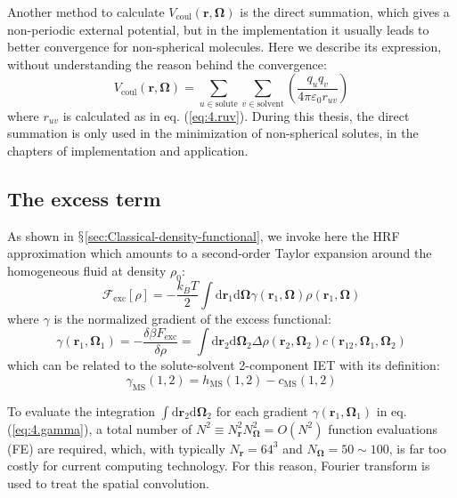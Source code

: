 Another method to calculate $V_{\mathrm{coul}}(\mathbf{r},\mathbf{\Omega})$
is the direct summation, which gives a non-periodic external potential,
but in the implementation it usually leads to better convergence for
non-spherical molecules. Here we describe its expression, without understanding the reason
behind the convergence:
\begin{equation}
V_{\mathrm{coul}}(\mathbf{r},\mathbf{\Omega})=\sum_{u\in\mathrm{solute}}\sum_{v\in\mathrm{solvent}}\left(\dfrac{q_{u}q_{v}}{4\pi\varepsilon_{0}r_{uv}}\right)
\end{equation}
where $r_{uv}$ is calculated as in eq. (\ref{eq:4.ruv}). During
this thesis, the direct summation is only used in the minimization
of non-spherical solutes, in the chapters of implementation and application.

\subsection{The excess term\label{subsec:The-excess-term}}

As shown in $\mathsection$\ref{sec:Classical-density-functional},
we invoke here the \acs{HRF} approximation which amounts to a second-order
Taylor expansion around the homogeneous fluid at density $\rho_{0}$:
\begin{equation}
\mathcal{F}_{\mathrm{exc}}[\rho]=-\frac{k_{B}T}{2}\int\mathrm{d}\mathbf{r}_{1}\mathrm{d}\mathbf{\mathbf{\Omega}}\gamma(\mathbf{r}_{1},\mathbf{\mathbf{\mathbf{\mathbf{\Omega}}}})\rho(\mathbf{r}_{1},\mathbf{\mathbf{\mathbf{\mathbf{\Omega}}}})\label{eq:4.fexc}
\end{equation}
where $\gamma$ is the normalized gradient of the excess functional:
\begin{equation}
\gamma(\mathbf{r}_{1},\mathbf{\Omega}_{1})=-\frac{\delta\beta F_{\mathrm{exc}}}{\delta\rho}=\int\mathrm{d}\mathbf{r}_{2}\mathrm{d}\mathbf{\Omega}_{2}\Delta\rho(\mathbf{r}_{2},\mathbf{\Omega}_{2})c(\mathbf{r}_{12},\mathbf{\Omega}_{1},\mathbf{\Omega}_{2})\label{eq:4.gamma}
\end{equation}
which can be related to the solute-solvent 2-component \acs{IET}
with its definition:
\begin{equation}
\gamma_{\mathrm{MS}}(1,2)=h_{\mathrm{MS}}(1,2)-c_{\mathrm{MS}}(1,2)
\end{equation}

To evaluate the integration $\int\mathrm{d}\mathbf{r}_{2}\mathrm{d}\mathbf{\Omega}_{2}$
for each gradient $\gamma(\mathbf{r}_{1},\mathbf{\Omega}_{1})$ in
eq. (\ref{eq:4.gamma}), a total number of $N^{2}\equiv N_{\mathbf{r}}^{2}N_{\mathbf{\Omega}}^{2}=O(N^{2})$
function evaluations (\acs{FE}) are required, which, with typically
$N_{\mathbf{r}}=64^{3}$ and $N_{\mathbf{\Omega}}=50\sim100$, is
far too costly for current computing technology. For this reason,
Fourier transform is used to treat the spatial convolution.

